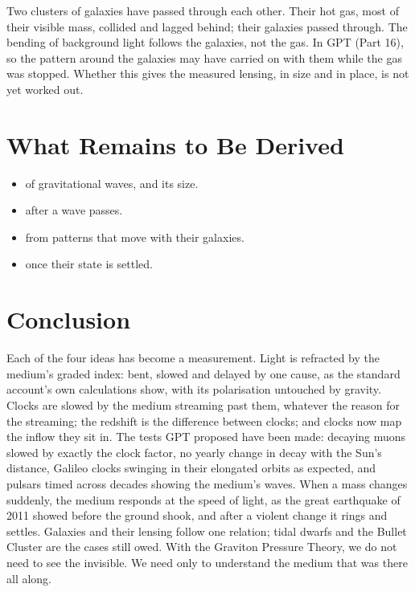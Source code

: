  Two clusters of galaxies have passed through each other. Their hot gas, most of their visible mass, collided and lagged behind; their galaxies passed through. The bending of background light follows the galaxies, not the gas. In GPT  (Part 16), so the pattern around the galaxies may have carried on with them while the gas was stopped. Whether this gives the measured lensing, in size and in place, is not yet worked out.

\section{What Remains to Be Derived}

\begin{itemize}
\item {} of gravitational waves, and its size.
\item {} after a wave passes.
\item {} from patterns that move with their galaxies.
\item {} once their state is settled.
\end{itemize}

\section*{Conclusion}

Each of the four ideas has become a measurement. Light is refracted by the medium's graded index: bent, slowed and delayed by one cause, as the standard account's own calculations show, with its polarisation untouched by gravity. Clocks are slowed by the medium streaming past them, whatever the reason for the streaming; the redshift is the difference between clocks; and clocks now map the inflow they sit in. The tests GPT proposed have been made: decaying muons slowed by exactly the clock factor, no yearly change in decay with the Sun's distance, Galileo clocks swinging in their elongated orbits as expected, and pulsars timed across decades showing the medium's waves. When a mass changes suddenly, the medium responds at the speed of light, as the great earthquake of 2011 showed before the ground shook, and after a violent change it rings and settles. Galaxies and their lensing follow one relation; tidal dwarfs and the Bullet Cluster are the cases still owed. With the Graviton Pressure Theory, we do not need to see the invisible. We need only to understand the medium that was there all along.

